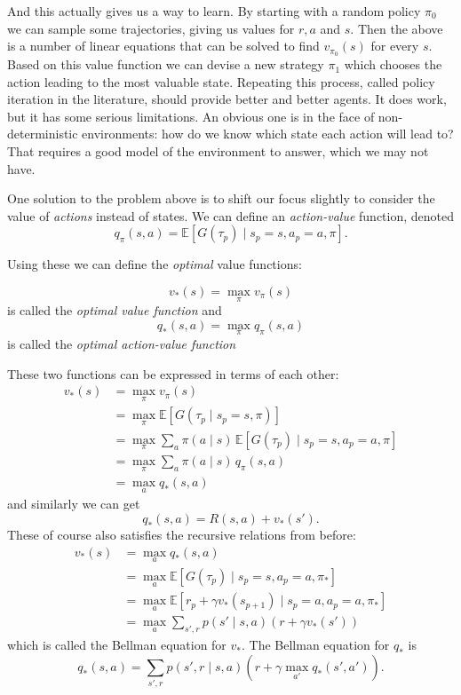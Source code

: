 \documentclass{article}
\theoremstyle{changedot}
\theoremstyle{changedotbreak}
\theoremstyle{nonumberplain}
\newcommand{\m}{\mathbb}
\begin{document}
And this actually gives us a way to learn. By starting with a random policy $\pi_{0}$ we can sample some trajectories, giving us values for $r, a$ and $s$. Then the above is a number of linear equations that can be solved to find $v_{\pi_{0}}(s)$ for every $s$. Based on this value function we can devise a new strategy $\pi_{1}$ which chooses the action leading to the most valuable state. Repeating this process, called policy iteration in the literature, should provide better and better agents. It does work, but it has some serious limitations. An obvious one is in the face of non-deterministic environments: how do we know which state each action will lead to? That requires a good model of the environment to answer, which we may not have.

One solution to the problem above is to shift our focus slightly to consider the value of \emph{actions} instead of states. We can define an \emph{action-value} function, denoted \[q_{\pi}(s, a) = \m E[G(\tau_{p}) \mid s_{p} = s, a_{p} = a, \pi]. \]

Using these we can define the \emph{optimal} value functions:

\begin{definition}
  \[v_{*}(s) = \max_{\pi} v_{\pi}(s)\] is called the \emph{optimal value function} and \[q_{*}(s, a) = \max_{\pi} q_{\pi}(s, a)\] is called the \emph{optimal action-value function}
\end{definition}

These two functions can be expressed in terms of each other:
\begin{align*}
  v_{*}(s) &= \max_{\pi} v_{\pi}(s) \\
           &= \max_{\pi} \m E[G(\tau_{p} \mid s_{p} = s, \pi)] \\
           &= \max_{\pi} \sum_{a} \pi(a \mid s) \, \m E[G(\tau_{p}) \mid s_{p} = s, a_{p} = a, \pi] \\
           &= \max_{\pi} \sum_{a} \pi(a \mid s) \, q_{\pi} (s, a) \\
  &= \max_{a} q_{*}(s, a)
\end{align*}
and similarly we can get \[q_{*}(s, a) = R(s, a) + v_{*}(s').\] These of course also satisfies the recursive relations from before:
\begin{align*}
  v_{*}(s) &= \max_{a} q_{*}(s, a) \\
           &= \max_{a} \m E[G(\tau_{p}) \mid s_{p} = s, a_{p} = a, \pi_{*}] \\
           &= \max_{a} \m E[r_{p} + \gamma v_{*}(s_{p+1}) \mid s_{p} = a, a_{p} = a, \pi_{*}] \\
           &= \max_{a} \sum_{s', r} p(s' \mid s, a) (r + \gamma v_{*}(s') )
\end{align*}
which is called the Bellman equation for $v_{*}$. The Bellman equation for $q_{*}$ is
\[q_{*}(s, a) = \sum_{s', r} p(s', r \mid s, a) (r + \gamma \max_{a'} q_{*}(s', a')).\]
\end{document}
